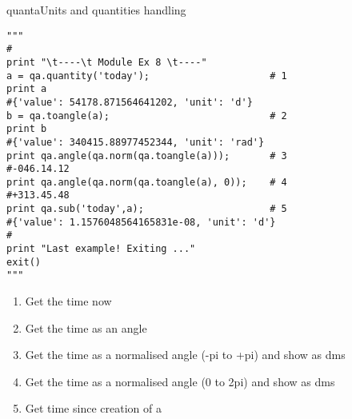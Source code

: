 \begin{ahmodule}{quanta}{Units and quantities handling}
\begin{ahdescription}
\begin{verbatim}
"""
#
print "\t----\t Module Ex 8 \t----"
a = qa.quantity('today');                     # 1
print a
#{'value': 54178.871564641202, 'unit': 'd'}
b = qa.toangle(a);                            # 2
print b
#{'value': 340415.88977452344, 'unit': 'rad'}
print qa.angle(qa.norm(qa.toangle(a)));       # 3
#-046.14.12
print qa.angle(qa.norm(qa.toangle(a), 0));    # 4
#+313.45.48
print qa.sub('today',a);                      # 5
#{'value': 1.1576048564165831e-08, 'unit': 'd'}
#
print "Last example! Exiting ..."
exit()
"""
\end{verbatim}

\begin{enumerate}
   \item Get the time now
   \item Get the time as an angle
   \item Get the time as a normalised angle (-pi to +pi) and show as dms
   \item Get the time as a normalised angle (0 to 2pi) and show as dms
   \item Get time since creation of a
\end{enumerate}







\end{ahdescription}

\ahfuncs{}
\ahobjs{}



\end{ahmodule}
